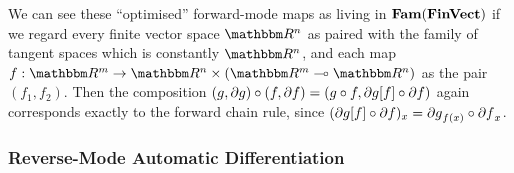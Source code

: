 We can see these ``optimised'' forward-mode maps as living in $\mathbf{Fam}(\mathbf{FinVect})$ if we regard every finite
vector space $\RR^n$ as paired with the family of tangent spaces which is constantly $\RR^n$, and each map $f:
\RR^m \to \RR^n \times (\RR^m \linearto \RR^n)$ as the pair $(f_1, f_2)$. Then the composition $(g, \partial
g) \circ (f, \partial f) = (g \circ f, \partial g[f] \circ \partial f)$ again corresponds exactly to
the forward chain rule, since $(\partial g[f] \circ \partial f)_x = {\partial g}_{f(x)} \circ
{\partial f}_x$.


\subsubsection{Reverse-Mode Automatic Differentiation}


